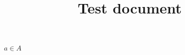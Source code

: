 \documentclass{article}
\title{Test document}
\begin{document}
\maketitle

$a \in A$
\end{document}
